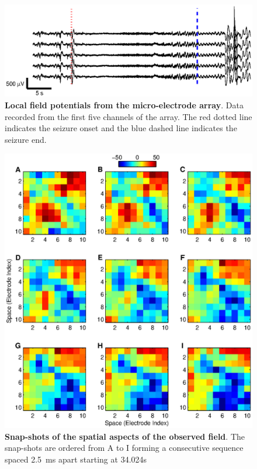 \documentclass[]{article}
\begin{document}
\begin{figure}[!ht]
\begin{center}
\includegraphics{./Figures/LFPs.eps}
\end{center}
\caption{{\bf Local field potentials from the micro-electrode array}. Data recorded from the first five channels of the array. The red dotted line indicates the seizure onset and the blue dashed line indicates the seizure end.}
\label{fig:TimeSeries}
\end{figure}

\begin{figure}[!ht]
\begin{center}
\includegraphics{./Figures/FieldObservations.eps}
\end{center}
\caption{{\bf Snap-shots of the spatial aspects of the observed field}. The snap-shots are ordered from A to I forming a consecutive sequence spaced 2.5~ms apart starting at 34.024s}
\label{fig:FieldObserations}
\end{figure}
\end{document}
